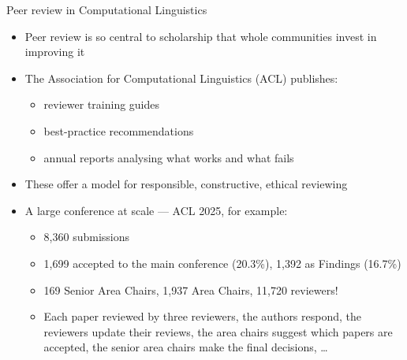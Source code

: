\documentclass[aspectratio=169]{beamer}
\begin{document}
\begin{frame}{Peer review in Computational Linguistics}
\begin{itemize}
  \item Peer review is so central to scholarship that whole communities invest in improving it
  \item The Association for Computational Linguistics (ACL) publishes:
    \begin{itemize}
      \item reviewer training guides \citep{acl2023reviewbasics}
      \item best-practice recommendations  \citep{aclarrguidelines}
      \item annual reports analysing what works and what fails \citep{aclcopr2023}
    \end{itemize}
  \item These offer a model for responsible, constructive, ethical reviewing
  \item A large conference at scale --- ACL 2025, for example:
    \begin{itemize}
    \item  8,360 submissions
    \item  1,699 accepted to the main conference (20.3\%), 1,392 as Findings (16.7\%)
    \item  169 Senior Area Chairs, 1,937 Area Chairs, 11,720 reviewers!
    \item Each paper reviewed by three reviewers, the authors respond, the reviewers update their reviews,  the area chairs suggest which papers are accepted, the senior area chairs make the final decisions, \ldots
    \end{itemize}
\end{itemize}
\end{frame}

\end{document}
